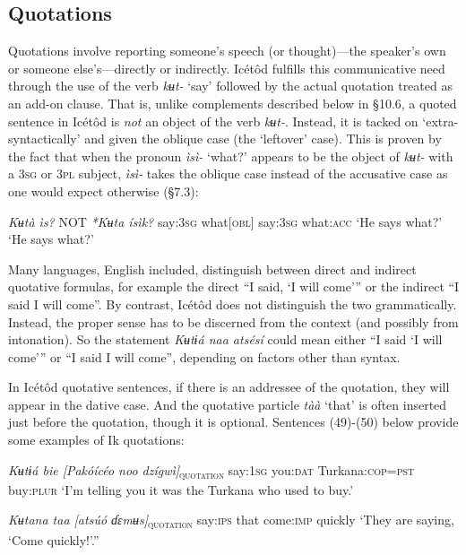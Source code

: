 \subsection{Quotations}


Quotations involve reporting someone’s speech (or thought)—the speaker’s own or someone else’s—directly or indirectly. Icétôd fulfills this communicative need through the use of the verb \textit{kʉt-} ‘say’ followed by the actual quotation treated as an add-on clause. That is, unlike complements described below in §10.6, a quoted sentence in Icétôd is \textit{not} an object of the verb \textit{kʉt-}. Instead, it is tacked on ‘extra-syntactically’ and given the oblique case (the ‘leftover’ case). This is proven by the fact that when the pronoun \textit{ìsì-} ‘what?’ appears to be the object of \textit{kʉt-} with a \textsc{3sg} or \textsc{3pl} subject, \textit{ìsì-} takes the oblique case instead of the accusative case as one would expect otherwise (§7.3):




\textit{Kʉtà     ìs?}    NOT  \textit{*Kʉta   ísìk?}
say:\textsc{3sg}   what[\textsc{obl}]    say:\textsc{3sg}   what:\textsc{acc}
‘He says what?’      ‘He says what?’


Many languages, English included, distinguish between direct and indirect quotative formulas, for example the direct “I said, ‘I will come’” or the indirect “I said I will come”. By contrast, Icétôd does not distinguish the two grammatically. Instead, the proper sense has to be discerned from the context (and possibly from intonation). So the statement \textit{Kʉtɨá naa atsésí} could mean either “I said ‘I will come’” or “I said I will come”, depending on factors other than syntax. 

In Icétôd quotative sentences, if there is an addressee of the quotation, they will appear in the dative case. And the quotative particle \textit{tàà} ‘that’ is often inserted just before the quotation, though it is optional. Sentences (49)-(50) below provide some examples of Ik quotations:



\textit{Kʉtɨá     bie   [Pakóícéo noo   dzígwì]}\textsc{\textsubscript{quotation}}
say:\textsc{1sg}   you:\textsc{dat} Turkana:\textsc{cop=pst} buy:\textsc{plur}
‘I’m telling you it was the Turkana who used to buy.’




\textit{Kʉtana   taa   [atsúó   ɗɛmʉs]}\textsc{\textsubscript{quotation}} 
say:\textsc{ips}  that   come:\textsc{imp}   quickly
‘They are saying, ‘Come quickly!’.”







